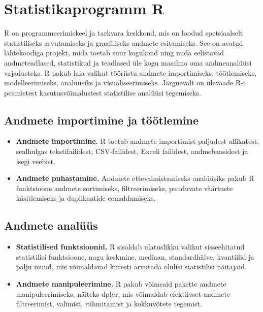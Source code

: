 \documentclass[
]{book}
\providecommand{\tightlist}{%
  \setlength{\itemsep}{0pt}\setlength{\parskip}{0pt}}
\begin{document}
\section{Statistikaprogramm R}\label{statistikaprogramm-r}

R on programmeerimiskeel ja tarkvara keskkond, mis on loodud spetsiaalselt statistiliseks arvutamiseks ja graafiliseks andmete esitamiseks. See on avatud lähtekoodiga projekt, mida toetab suur kogukond ning mida eelistavad andmeteadlased, statistikud ja teadlased üle kogu maailma oma andmeanalüüsi vajadusteks. R pakub laia valikut tööriistu andmete importimiseks, töötlemiseks, modelleerimiseks, analüüsiks ja visualiseerimiseks. Järgnevalt on ülevaade R-i peamistest kasutusvõimalustest statistilise analüüsi tegemiseks.

\subsection{Andmete importimine ja töötlemine}\label{andmete-importimine-ja-tuxf6uxf6tlemine}

\begin{itemize}
\tightlist
\item
  \textbf{Andmete importimine.} R toetab andmete importimist paljudest allikatest, sealhulgas tekstifailidest, CSV-failidest, Exceli failidest, andmebaasidest ja isegi veebist.
\item
  \textbf{Andmete puhastamine.} Andmete ettevalmistamiseks analüüsiks pakub R funktsioone andmete sortimiseks, filtreerimiseks, puuduvate väärtuste käsitlemiseks ja duplikaatide eemaldamiseks.
\end{itemize}

\subsection{Andmete analüüs}\label{andmete-analuxfcuxfcs}

\begin{itemize}
\tightlist
\item
  \textbf{Statistilised funktsioonid.} R sisaldab ulatuslikku valikut sisseehitatud statistilisi funktsioone, nagu keskmine, mediaan, standardhälve, kvantiilid ja palju muud, mis võimaldavad kiiresti arvutada olulisi statistilisi näitajaid.
\item
  \textbf{Andmete manipuleerimine.} R pakub võimsaid pakette andmete manipuleerimiseks, näiteks dplyr, mis võimaldab efektiivset andmete filtreerimist, valimist, rühmitamist ja kokkuvõtete tegemist.
\end{itemize}
\end{document}
